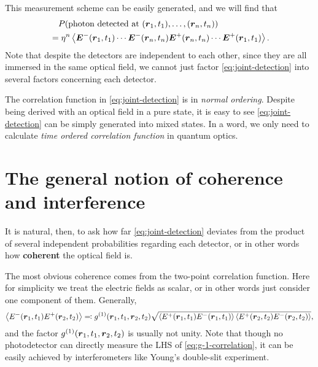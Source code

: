 \documentclass[hyperref, a4paper]{article}
\newcommand*{\concept}[1]{{\textbf{#1}}}
\begin{document}
This measurement scheme can be easily generated, and we will find that 
\begin{equation}
    \begin{aligned}
        &\quad P(\text{photon detected at ($\vb*{r}_1, t_1), \ldots, (\vb*{r}_n$}, t_n)) \\
        &= \eta^n \expval{\vb*{E}^-(\vb*{r}_1, t_1) \cdots \vb*{E}^-(\vb*{r}_n, t_n) \vb*{E}^+(\vb*{r}_n, t_n) \cdots \vb*{E}^+(\vb*{r}_1, t_1)}.
    \end{aligned}
    \label{eq:joint-detection}
\end{equation}
Note that despite the detectors are independent to each other, since they are all immersed in the same optical field, we cannot just factor \eqref{eq:joint-detection} into several factors concerning each detector.

The correlation function in \eqref{eq:joint-detection} is in \emph{normal ordering}.
Despite being derived with an optical field in a pure state, it is easy to see \eqref{eq:joint-detection} can be simply generated into mixed states.
In a word, we only need to calculate \emph{time ordered correlation function} in quantum optics.

\section{The general notion of coherence and interference}

It is natural, then, to ask how far \eqref{eq:joint-detection} deviates from the product of several independent probabilities regarding each detector, or in other words how \concept{coherent} the optical field is.

The most obvious coherence comes from the two-point correlation function. 
Here for simplicity we treat the electric fields as scalar, or in other words just consider one component of them.
Generally, 
\begin{equation}
    \expval{{E}^-(\vb*{r}_1, t_1) {E}^+(\vb*{r}_2, t_2)} \eqqcolon g^{(1)}(\vb*{r}_1, t_1, \vb*{r}_2, t_2) \sqrt{\expval{{E}^+(\vb*{r}_1, t_1) {E}^-(\vb*{r}_1, t_1)} \expval{{E}^+(\vb*{r}_2, t_2) {E}^-(\vb*{r}_2, t_2)}} , 
    \label{eq:g-1-correlation}
\end{equation}
and the factor $g^{(1)}(\vb*{r}_1, t_1, \vb*{r}_2, t_2)$ is usually not unity.
Note that though no photodetector can directly measure the LHS of \eqref{eq:g-1-correlation}, it can be easily achieved by interferometers like Young's double-slit experiment.
\end{document}
